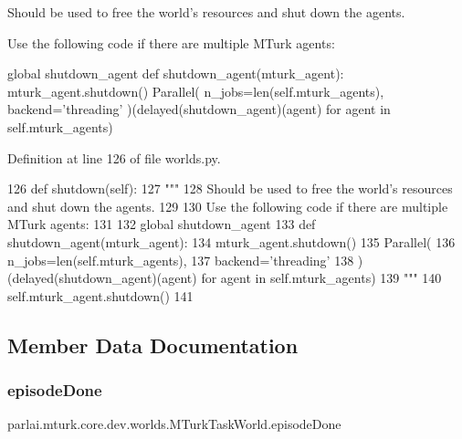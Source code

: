 \begin{DoxyVerb}Should be used to free the world's resources and shut down the agents.

Use the following code if there are multiple MTurk agents:

global shutdown_agent
def shutdown_agent(mturk_agent):
    mturk_agent.shutdown()
Parallel(
    n_jobs=len(self.mturk_agents),
    backend='threading'
)(delayed(shutdown_agent)(agent) for agent in self.mturk_agents)
\end{DoxyVerb}
 

Definition at line 126 of file worlds.\+py.


\begin{DoxyCode}
126     \textcolor{keyword}{def }shutdown(self):
127         \textcolor{stringliteral}{"""}
128 \textcolor{stringliteral}{        Should be used to free the world's resources and shut down the agents.}
129 \textcolor{stringliteral}{}
130 \textcolor{stringliteral}{        Use the following code if there are multiple MTurk agents:}
131 \textcolor{stringliteral}{}
132 \textcolor{stringliteral}{        global shutdown\_agent}
133 \textcolor{stringliteral}{        def shutdown\_agent(mturk\_agent):}
134 \textcolor{stringliteral}{            mturk\_agent.shutdown()}
135 \textcolor{stringliteral}{        Parallel(}
136 \textcolor{stringliteral}{            n\_jobs=len(self.mturk\_agents),}
137 \textcolor{stringliteral}{            backend='threading'}
138 \textcolor{stringliteral}{        )(delayed(shutdown\_agent)(agent) for agent in self.mturk\_agents)}
139 \textcolor{stringliteral}{        """}
140         self.mturk\_agent.shutdown()
141 
\end{DoxyCode}


\subsection{Member Data Documentation}
\mbox{\label{classparlai_1_1mturk_1_1core_1_1dev_1_1worlds_1_1MTurkTaskWorld_a31c19dded93517b4a840dbba6dbb6612}} 
\subsubsection{\texorpdfstring{episode\+Done}{episodeDone}}
{\footnotesize\ttfamily parlai.\+mturk.\+core.\+dev.\+worlds.\+M\+Turk\+Task\+World.\+episode\+Done}



